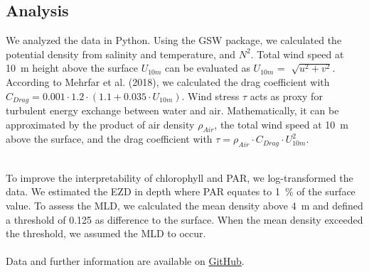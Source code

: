 \documentclass[../Main.tex]{subfiles}
\begin{document}
\subsection*{\crule[blue]{.2cm}{.2cm} Analysis}
We analyzed the data in Python. 
Using the GSW package, we calculated the potential density from salinity and temperature, and $N^2$\supercite{gsw}. 
Total wind speed at \SI{10}{m} height above the surface $U_{10m}$ can be evaluated as $U_{10m}$ = $\sqrt[]{u^2 + v^2}$. 
According to Mehrfar et al. (2018)\supercite{Mehrfar2018}, we calculated the drag coefficient with $C_{Drag} = 0.001\cdot1.2\cdot  (1.1+0.035\cdot U_{10m})$. 
Wind stress $\tau$ acts as proxy for turbulent energy exchange between water and air.
Mathematically, it can be approximated by the product of air density $\rho_{Air}$, the total wind speed at \SI{10}{m} above the surface, and the drag coefficient with $\tau = \rho_{Air}\cdot C_{Drag}\cdot U_{10m}^2$\supercite{Mehrfar2018}.

\\
To improve the interpretability of chlorophyll and PAR, we log-transformed the data.
We estimated the EZD in depth where PAR equates to \SI{1}{\%} of the surface value\supercite{Lee2007}.
To assess the MLD, we calculated the mean density above \SI{4}{m} and defined a threshold of 0.125 as difference to the surface. When the mean density exceeded the threshold, we assumed the MLD to occur. 
\\
\\
Data and further information are available on \href{https://github.com/joaldi2208/BloomDynamics}{GitHub}.
\end{document}
